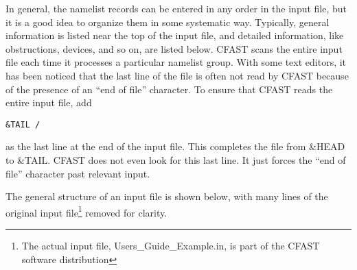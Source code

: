 In general, the namelist records can be entered in any order in the input file, but it is a good idea to organize them in some systematic way. Typically, general information is listed near the top of the input file, and detailed information, like obstructions, devices, and so on, are listed below. CFAST scans the entire input file each time it processes a particular namelist group. With some text editors, it has been noticed that the last line of the file is often not read by CFAST because of the presence of an ``end of file'' character. To ensure that CFAST reads the entire input file, add
\begin{lstlisting}
&TAIL /
\end{lstlisting}
as the last line at the end of the input file. This completes the file from {\ct \&HEAD} to {\ct \&TAIL}. CFAST does not even look for this last line. It just forces the ``end of file'' character past relevant input.

The general structure of an input file is shown below, with many lines of the original input file\footnote{The actual input file, Users\_Guide\_Example.in, is part of the CFAST software distribution} removed for clarity.

